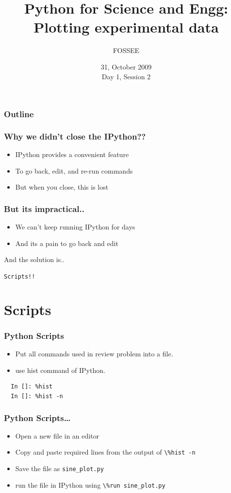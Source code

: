 \documentclass[14pt,compress]{beamer}
\title[Plotting with Python]{Python for Science and Engg: Plotting experimental data}
\author[FOSSEE] {FOSSEE}
\institute[IIT Bombay] {Department of Aerospace Engineering\\IIT Bombay}
\date[] {31, October 2009\\Day 1, Session 2}
\newcommand{\typ}[1]{\lstinline{#1}}
\begin{document}
\begin{frame}
  \titlepage
\end{frame}

\begin{frame}
  \frametitle{Outline}
  \tableofcontents
\end{frame}

\begin{frame}
\frametitle{Why we didn't close the IPython??}
\begin{itemize}
  \item IPython provides a convenient feature
  \item To go back, edit, and re-run commands
  \item But when you close, this is lost
\end{itemize}
\end{frame}

\begin{frame}
\frametitle{But its impractical..}
\begin{itemize}
  \item We can't keep running IPython for days
  \item And its a pain to go back and edit
\end{itemize}
And the solution is..\\
\begin{center}
\alert {\typ{Scripts!!}}
\end{center}
\end{frame}

\section{Scripts}
\begin{frame}[fragile]
\frametitle{Python Scripts}
\begin{itemize}
\item Put all commands used in review problem into a file. 
\item use hist command of IPython.
\end{itemize}
\begin{lstlisting}
  In []: %hist
  In []: %hist -n
\end{lstlisting}
\end{frame}

\begin{frame}
\frametitle{Python Scripts\ldots}
  \begin{itemize}
    \item Open a new file in an \alert{editor}
    \item Copy and paste required lines from the output of \typ{\%hist -n}
    \item Save the file as \typ{sine_plot.py}
  \end{itemize}
  \begin{itemize}
  \item run the file in IPython using \typ{\%run sine_plot.py}\\
  \end{itemize}
\end{frame}
\end{document}
